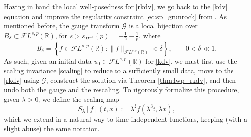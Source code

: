 \documentclass[a4paper,
11pt,  reqno]{amsart}
\newcommand{\5}{\textup{V}}
\newcommand{\FL}{\mathcal{F} L}
\theoremstyle{remark}
\newcommand{\R}{\mathbb{R}}
\newcommand{\Gc}{\mathcal{G}}
\numberwithin{equation}{section}
\numberwithin{theorem}{section}
\begin{document}
Having in hand the local well-posedness for \eqref{rkdv}, we go back to the \eqref{kdv} equation and improve the regularity constraint \eqref{eq:sp_grunrock} from \cite{Grunrock_ldv_hier}. As mentioned before, the gauge transform $\Gc$ is a local bijection over $B_\delta\subset \FL^{s,p}(\R)$, for $s>s_{H^{-1}}(p) = -\frac12-\frac1p$, where
$$
B_\delta=\left\{ f \in \FL^{s,p}(\R): \|f\|_{\FL^{s,p}(\R)}<\delta\right\},\qquad 0<\delta\ll 1.
$$
As such, given an initial data $u_0\in \FL^{s,p}(\R)$ for \eqref{kdv}, we must first use the scaling invariance \eqref{scaling} to reduce to a sufficiently small data, move to the \eqref{rkdv} using $\Gc$, construct the solution via Theorem \ref{thm:lwp_rkdv}, and then undo both the gauge and the rescaling.
To rigorously formalize this procedure,  given $\lambda>0$, we define the scaling map
   \begin{equation}
    \label{SR}
    S_\lambda[f](t,x) := \lambda^2 f(\lambda^3 t, \lambda x),
   \end{equation}
which we extend in a natural way to time-independent functions, keeping (with a slight abuse) the same notation.
\end{document}
